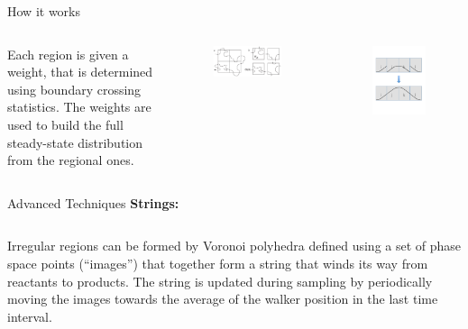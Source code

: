 \documentclass[final]{beamer}
\begin{document}
\begin{columns}[t]
\begin{column}{.25 \linewidth}
\begin{block}{How it works}
	  \begin{columns}[t]
	    \begin{column}{.4\linewidth}
	      Each region is given a weight, that is determined using boundary crossing statistics.
	      The weights are used to build the full steady-state distribution from the regional ones.
	    \end{column}
	    \begin{column}{.25\linewidth}
	      \begin{figure}
		\includegraphics[width=3 in]{images/motivation2.pdf}
	      \end{figure}
	    \end{column}
	    \begin{column}{.25\linewidth}
	      \begin{figure}
		\includegraphics[width=2 in]{images/patch.pdf}
	      \end{figure}
	    \end{column}
	  \end{columns}

        \end{block}
	\begin{block}{Advanced Techniques}
	  \textbf{Strings:}

	  \begin{columns}[t]
	    \begin{column}{.65\linewidth}

	  Irregular regions can be formed by Voronoi polyhedra defined using a set of phase space points (``images'') that together form a string that winds its way from reactants to products.
	  The string is updated during sampling by periodically moving the images towards the average of the walker position in the last time interval.


\end{column}
\end{columns}
\end{block}
\end{column}
\end{columns}
\end{document}
